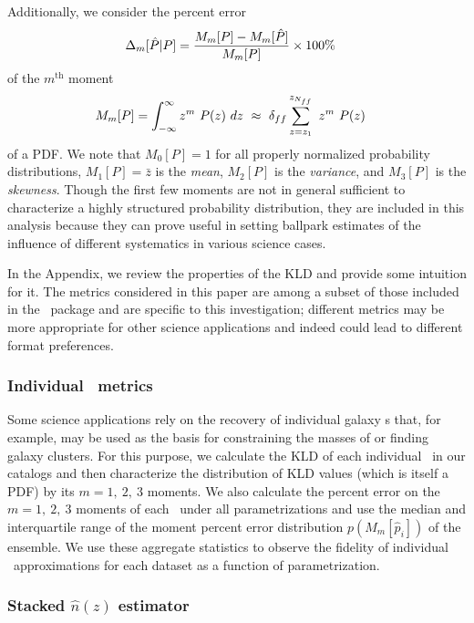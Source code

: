 Additionally, we consider the percent error
\begin{align}
\eqlabel{eq:percent_error}
\Delta_{m}[\hat{P} | P] &= \frac{M_{m}[P] - 
	M_{m}[\hat{P}]}{M_{m}[P]}\times100\%
\end{align}
of the $m^{\mathrm{th}}$ moment
\begin{align}
\eqlabel{eq:moment}
M_{m}[P] &= \int_{-\infty}^{\infty} z^{m}\ P(z)\ dz\ \approx\  
\delta_{ff}\sum_{z=z_{1}}^{z_{N_{ff}}}\ z^{m}\ P(z)
\end{align}
of a PDF.
We note that $M_{0}[P]=1$ for all properly normalized probability 
distributions, $M_{1}[P]=\bar{z}$ is the \textit{mean}, $M_{2}[P]$ is the 
\textit{variance}, and $M_{3}[P]$ is the \textit{skewness}.
Though the first few moments are not in general sufficient to characterize a 
highly structured probability distribution, they are included in this analysis 
because they can prove useful in setting ballpark estimates of the influence of 
different systematics in various science cases.

In the Appendix, we review the properties of the KLD and provide some intuition 
for it.
The metrics considered in this paper are among a subset of those included in 
the \qp\ package and are specific to this investigation; different metrics may 
be more appropriate for other science applications and indeed could lead to 
different format preferences.

\subsubsection{Individual \pz\ metrics}

Some science applications rely on the recovery of individual galaxy \pz s that, 
for example, may be used as the basis for constraining the masses of 
\citep{applegate_weighing_2014} or finding \citep{radovich_searching_2017} 
galaxy clusters.
For this purpose, we calculate the KLD of each individual \pz\ in our catalogs 
and then characterize the distribution of KLD values (which is itself a PDF) by 
its $m=1,\ 2,\ 3$ moments.
We also calculate the percent error on the $m=1,\ 2,\ 3$ moments of each \pz\ 
under all parametrizations and use the median and interquartile range of the 
moment percent error distribution $p(M_{m}[\hat{p}_{i}])$ of the ensemble.
We use these aggregate statistics to observe the fidelity of individual \pz\ 
approximations for each dataset as a function of parametrization.

\subsubsection{Stacked $\hat{n}(z)$ estimator}
\sectlabel{sec:stacked_metric}

